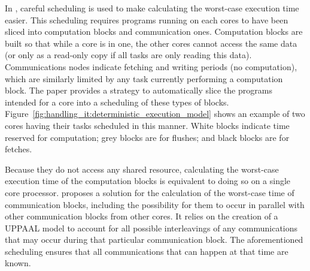 In \cite{10.1007/978-3-642-28293-5_9}, careful scheduling is used to make
calculating the worst-case execution time easier. This scheduling requires
programs running on each cores to have been sliced into computation blocks and
communication ones. Computation blocks are built so that while a core is in
one, the other cores cannot access the same data (or only as a read-only copy
if all tasks are only reading this data). Communications nodes indicate
fetching and writing periods (no computation), which are similarly limited by
any task currently performing a computation block. The paper provides a
strategy to automatically slice the programs intended for a core into a
scheduling of these types of blocks.
Figure~\ref{fig:handling_it:deterministic_execution_model} shows an example of
two cores having their tasks scheduled in this manner. White blocks indicate
time reserved for computation; grey blocks are for flushes; and black blocks
are for fetches.

Because they do not access any shared resource, calculating the worst-case
execution time of the computation blocks is equivalent to doing so on a single
core processor. \cite{10.1007/978-3-642-28293-5_9} proposes a solution for the
calculation of the worst-case time of communication blocks, including the
possibility for them to occur in parallel with other communication blocks from
other cores. It relies on the creation of a UPPAAL model to account for all
possible interleavings of any communications that may occur during that
particular communication block.  The aforementioned scheduling ensures that all
communications that can happen at that time are known.


\stopallthesefloats
